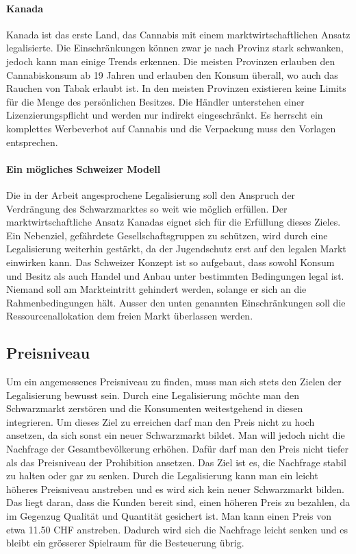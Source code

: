\documentclass[../main.tex]{subfiles}
\begin{document}
	 
	 \paragraph{Kanada}
	 Kanada ist das erste Land, das Cannabis mit einem marktwirtschaftlichen Ansatz legalisierte.
	 Die Einschränkungen können zwar je nach Provinz stark schwanken, jedoch kann man einige Trends erkennen.
	 Die meisten Provinzen erlauben den Cannabiskonsum ab 19 Jahren und erlauben den Konsum überall, wo auch das Rauchen von Tabak erlaubt ist.
	 In den meisten Provinzen existieren keine Limits für die Menge des persönlichen Besitzes.
	 Die Händler unterstehen einer Lizenzierungspflicht und werden nur indirekt eingeschränkt. 
	 Es herrscht ein komplettes Werbeverbot auf Cannabis und die Verpackung muss den Vorlagen entsprechen.
	 
	 
	 
	
	 
	 
	 \paragraph{Ein mögliches Schweizer Modell}
	 Die in der Arbeit angesprochene Legalisierung soll den Anspruch der Verdrängung des Schwarzmarktes so weit wie möglich erfüllen.
	 Der marktwirtschaftliche Ansatz Kanadas eignet sich für die Erfüllung dieses Zieles.
	 Ein Nebenziel, gefährdete Gesellschaftsgruppen zu schützen, wird durch eine Legalisierung weiterhin gestärkt, da der Jugendschutz erst auf den legalen Markt einwirken kann.
	 Das Schweizer Konzept ist so aufgebaut, dass sowohl Konsum und Besitz als auch Handel und Anbau unter bestimmten Bedingungen legal ist.
	 Niemand soll am Markteintritt gehindert werden, solange er sich an die Rahmenbedingungen hält.
	 Ausser den unten genannten Einschränkungen soll die Ressourcenallokation dem freien Markt überlassen werden.
	 
	
	 
	 
	 \subsection{Preisniveau}
	 
	 Um ein angemessenes Preisniveau zu finden, muss man sich stets den Zielen der Legalisierung bewusst sein. 
	 Durch eine Legalisierung möchte man den Schwarzmarkt zerstören und die Konsumenten weitestgehend in diesen integrieren. 
	 Um dieses Ziel zu erreichen darf man den Preis nicht zu hoch ansetzen, da sich sonst ein neuer Schwarzmarkt bildet. 
	 Man will jedoch nicht die Nachfrage der Gesamtbevölkerung erhöhen. 
	 Dafür darf man den Preis nicht tiefer als das Preisniveau der Prohibition ansetzen. 
	 Das Ziel ist es, die Nachfrage stabil zu halten oder gar zu senken.
	 Durch die Legalisierung kann man ein leicht höheres Preisniveau anstreben und es wird sich kein neuer Schwarzmarkt bilden. 
	 Das liegt daran, dass die Kunden bereit sind, einen höheren Preis zu bezahlen, da im Gegenzug Qualität und Quantität gesichert ist. 
	 Man kann einen Preis von etwa 11.50 CHF anstreben. 
	 Dadurch wird sich die Nachfrage leicht senken und es bleibt ein grösserer Spielraum für die Besteuerung übrig.\\
	 
\end{document}
